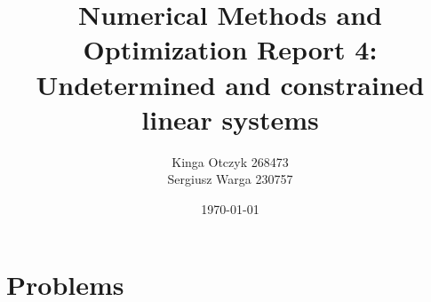 \documentclass[a4paper]{article}
\title{Numerical Methods and Optimization Report 4:
Undetermined and constrained linear systems}
\author{Kinga Otczyk 268473\\Sergiusz Warga 230757}
\date{\today}
\begin{document}
\maketitle
\tableofcontents
\pagebreak

\section{Problems}






\clearpage

\nocite{Zdunek, GoluVanl96}


\end{document}
